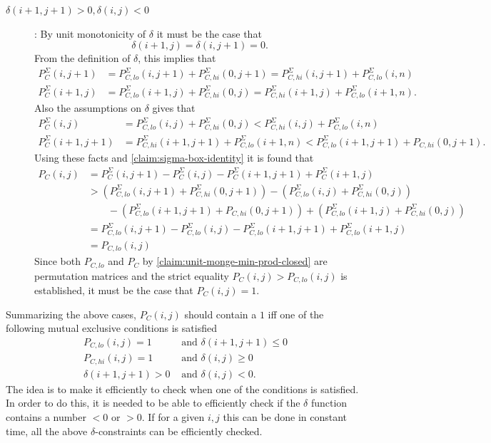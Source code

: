 \documentclass[twoside,11pt,openright]{report}
\begin{document}
\begin{description}
  \item[$\delta(i + 1, j + 1) > 0, \delta(i, j) < 0$]: By unit monotonicity of $\delta$ it must be the case that
  \[
    \delta(i + 1, j) = \delta(i, j + 1) = 0.
  \]
  From the definition of $\delta$, this implies that
  \begin{align*}
    P_C^{\Sigma}(i, j + 1) &= P_{C,lo}^{\Sigma}(i, j + 1) + P_{C,hi}^{\Sigma}(0, j + 1) = P_{C,hi}^{\Sigma}(i, j + 1) + P_{C,lo}^{\Sigma}(i, n) \\
    P_C^{\Sigma}(i + 1, j) &= P_{C,lo}^{\Sigma}(i + 1, j) + P_{C,hi}^{\Sigma}(0, j) = P_{C,hi}^{\Sigma}(i + 1, j) + P_{C,lo}^{\Sigma}(i + 1, n).
  \end{align*}
  Also the assumptions on $\delta$ gives that
  \begin{align*}
    P_C^\Sigma(i, j) &= P_{C,lo}^{\Sigma}(i, j) + P_{C,hi}^{\Sigma}(0, j) < P_{C,hi}^{\Sigma}(i, j) + P_{C,lo}^{\Sigma}(i, n) \\
    P_C^{\Sigma}(i + 1, j + 1) &= P_{C,hi}^{\Sigma}(i + 1, j + 1) + P_{C,lo}^{\Sigma}(i + 1, n) < P_{C,lo}^{\Sigma}(i + 1, j + 1) + P_{C,hi}(0, j + 1).
  \end{align*}
  Using these facts and \cref{claim:sigma-box-identity} it is found that
  \begin{align*}
    P_C(i, j) &= P_C^{\Sigma}(i, j + 1) - P_C^{\Sigma}(i, j) - P_C^{\Sigma}(i + 1, j + 1) + P_C^{\Sigma}(i + 1, j) \\
    &> (P_{C,lo}^{\Sigma}(i, j + 1) + P_{C,hi}^{\Sigma}(0, j + 1)) - (P_{C,lo}^{\Sigma}(i, j) + P_{C,hi}^{\Sigma}(0, j)) \\&\quad\quad - (P_{C,lo}^{\Sigma}(i + 1, j + 1) + P_{C,hi}(0, j + 1)) + (P_{C,lo}^{\Sigma}(i + 1, j) + P_{C,hi}^{\Sigma}(0, j)) \\
    &= P_{C,lo}^{\Sigma}(i, j + 1) - P_{C,lo}^{\Sigma}(i, j) - P_{C,lo}^{\Sigma}(i + 1, j + 1) + P_{C,lo}^{\Sigma}(i + 1, j) \\
    &= P_{C,lo}(i, j)
  \end{align*}
  Since both $P_{C,lo}$ and $P_C$ by \cref{claim:unit-monge-min-prod-closed} are permutation matrices and the strict equality $P_C(i, j) > P_{C,lo}(i, j)$ is established, it must be the case that $P_C(i, j) = 1$.
\end{description}
Summarizing the above cases, $P_C(i, j)$ should contain a $1$ iff one of the following mutual exclusive conditions is satisfied
\begin{align}
  P_{C,lo}(i, j) = 1 &\text{ and } \delta(i + 1, j + 1) \leq 0 \\
  P_{C,hi}(i, j) = 1 &\text{ and } \delta(i, j) \geq 0 \\
  \delta(i + 1, j + 1) > 0 &\text{ and } \delta(i, j) < 0.
\end{align}
The idea is to make it efficiently to check when one of the conditions is satisfied. In order to do this, it is needed to be able to efficiently check if the $\delta$ function contains a number $< 0$ or $> 0$. If for a given $i, j$ this can be done in constant time, all the above $\delta$-constraints can be efficiently checked.
\end{document}
